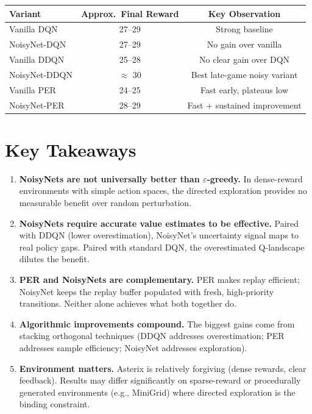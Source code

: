 \documentclass[12pt]{article}
\begin{document}
\begin{center}
\begin{tabular}{lcc}
  \toprule
  Variant & Approx.\ Final Reward & Key Observation \\
  \midrule
  Vanilla DQN         & 27--29 & Strong baseline \\
  NoisyNet-DQN        & 27--29 & No gain over vanilla \\
  Vanilla DDQN        & 25--28 & No clear gain over DQN \\
  NoisyNet-DDQN       & $\approx$ 30 & Best late-game noisy variant \\
  Vanilla PER         & 24--25 & Fast early, plateaus low \\
  NoisyNet-PER        & 28--29 & Fast + sustained improvement \\
  \bottomrule
\end{tabular}
\end{center}

\section{Key Takeaways}

\begin{enumerate}
  \item \textbf{NoisyNets are not universally better than $\varepsilon$-greedy.}
        In dense-reward environments with simple action spaces, the directed exploration
        provides no measurable benefit over random perturbation.

  \item \textbf{NoisyNets require accurate value estimates to be effective.}
        Paired with DDQN (lower overestimation), NoisyNet's uncertainty signal maps to
        real policy gaps. Paired with standard DQN, the overestimated Q-landscape
        dilutes the benefit.

  \item \textbf{PER and NoisyNets are complementary.}
        PER makes replay efficient; NoisyNet keeps the replay buffer populated with
        fresh, high-priority transitions. Neither alone achieves what both together do.

  \item \textbf{Algorithmic improvements compound.}
        The biggest gains come from stacking orthogonal techniques (DDQN addresses
        overestimation; PER addresses sample efficiency; NoisyNet addresses exploration).

  \item \textbf{Environment matters.}
        Asterix is relatively forgiving (dense rewards, clear feedback). Results may
        differ significantly on sparse-reward or procedurally generated environments
        (e.g., MiniGrid) where directed exploration is the binding constraint.
\end{enumerate}
\end{document}
